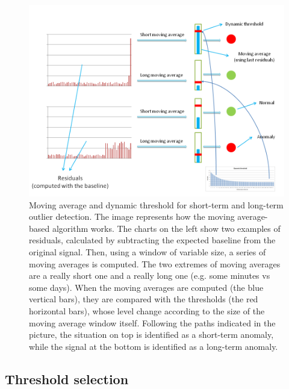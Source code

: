 \documentclass[12pt,a4paper,cucitura]{toptesi}
\begin{document}
\begin{figure}
\centering
\includegraphics[width=\linewidth]{movavg.png}
\caption[Moving average computation]{Moving average and dynamic threshold for short-term and long-term outlier detection. The image represents how the moving average-based algorithm works. The charts on the left show two examples of residuals, calculated by subtracting the expected baseline from the original signal. Then, using a window of variable size, a series of moving averages is computed. The two extremes of moving averages are a really short one and a really long one (e.g. some minutes vs some days). When the moving averages are computed (the blue vertical bars), they are compared with the thresholds (the red horizontal bars), whose level change according to the size of the moving average window itself. Following the paths indicated in the picture, the situation on top is identified as a short-term anomaly, while the signal at the bottom is identified as a long-term anomaly.}
\end{figure}

\subsection{Threshold selection}
\end{document}

